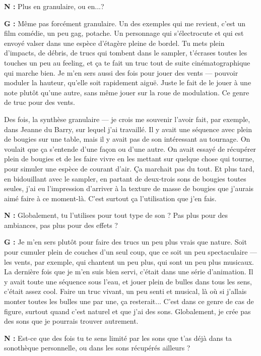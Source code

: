 ﻿\documentclass[12pt]{article}
\begin{document}
\textbf{N :} Plus en granulaire, ou en...? 

\textbf{G :} Même pas forcément granulaire. Un des exemples qui me revient, c'est un film comédie, un peu gag, potache. Un personnage qui s'électrocute et qui est envoyé valser dans une espèce d'étagère pleine de bordel. Tu mets plein d'impacts, de débris, de trucs qui tombent dans le sampler, t'écrases toutes les touches un peu au feeling, et ça te fait un truc tout de suite cinématographique qui marche bien. Je m'en sers aussi des fois pour jouer des vents — pouvoir moduler la hauteur, qu'elle soit rapidement aiguë. Juste le fait de le jouer à une note plutôt qu'une autre, sans même jouer sur la roue de modulation. Ce genre de truc pour des vents. 

Des fois, la synthèse granulaire — je crois me souvenir l'avoir fait, par exemple, dans Jeanne du Barry, sur lequel j'ai travaillé. Il y avait une séquence avec plein de bougies sur une table, mais il y avait pas de son intéressant au tournage. On voulait que ça s'entende d'une façon ou d'une autre. On avait essayé de récupérer plein de bougies et de les faire vivre en les mettant sur quelque chose qui tourne, pour simuler une espèce de courant d'air. Ça marchait pas du tout. Et plus tard, en bidouillant avec le sampler, en partant de deux-trois sons de bougies toutes seules, j'ai eu l'impression d'arriver à la texture de masse de bougies que j'aurais aimé faire à ce moment-là. C'est surtout ça l'utilisation que j'en fais. 

\textbf{N :} Globalement, tu l'utilises pour tout type de son ? Pas plus pour des ambiances, pas plus pour des effets ? 

\textbf{G :} Je m'en sers plutôt pour faire des trucs un peu plus vrais que nature. Soit pour cumuler plein de couches d'un seul coup, que ce soit un peu spectaculaire — les vents, par exemple, qui chantent un peu plus, qui sont un peu plus musicaux. La dernière fois que je m'en suis bien servi, c'était dans une série d'animation. Il y avait toute une séquence sous l'eau, et jouer plein de bulles dans tous les sens, c'était assez cool. Faire un truc vivant, un peu senti et musical, là où si j'allais monter toutes les bulles une par une, ça resterait... C'est dans ce genre de cas de figure, surtout quand c'est naturel et que j'ai des sons. Globalement, je crée pas des sons que je pourrais trouver autrement. 

\textbf{N :} Est-ce que des fois tu te sens limité par les sons que t'as déjà dans ta sonothèque personnelle, ou dans les sons récupérés ailleurs ? 
\end{document}
